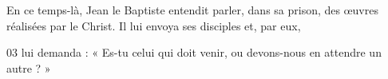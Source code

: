 En ce temps-là, Jean le Baptiste entendit parler, dans sa prison, des œuvres réalisées par le Christ. Il lui envoya ses disciples et, par eux,

03 lui demanda : « Es-tu celui qui doit venir, ou devons-nous en attendre un autre ? »
